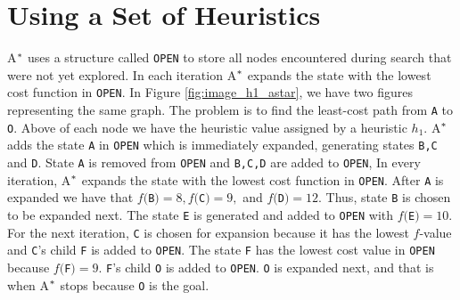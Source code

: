 \section{Using a Set of Heuristics}
A$\sp{*}$ uses a structure called \texttt{OPEN} to store all nodes encountered during search that were not yet explored. In each iteration A$\sp{*}$ expands the state with the lowest cost function in \texttt{OPEN}. In Figure \ref{fig:image_h1_astar}, we have two figures representing the same graph. The problem is to find the least-cost path from \texttt{A} to \texttt{O}. Above of each node we have the heuristic value assigned by a heuristic $h_{1}$. A$\sp{*}$ adds the state \texttt{A} in \texttt{OPEN} which is immediately expanded, generating states \texttt{B,C} and \texttt{D}. State \texttt{A} is removed from \texttt{OPEN} and \texttt{B,C,D} are added to \texttt{OPEN}, In every iteration, A$\sp{*}$ expands the state with the lowest cost function in \texttt{OPEN}. After \texttt{A} is expanded we have that $f($\texttt{B}$)=8, f($\texttt{C}$)=9,$ and $ f($\texttt{D}$)=12$. Thus, state \texttt{B} is chosen to be expanded next. The state \texttt{E} is generated and added to \texttt{OPEN} with $f($\texttt{E}$)=10$. For the next iteration, \texttt{C} is chosen for expansion because it has the lowest $f$-value and \texttt{C}'s child \texttt{F} is added to \texttt{OPEN}. The state \texttt{F} has the lowest cost value in \texttt{OPEN} because $f($\texttt{F}$)=9$. \texttt{F}'s child \texttt{O} is added to \texttt{OPEN}. \texttt{O} is expanded next, and that is when A$\sp{*}$ stops because \texttt{O} is the goal.

